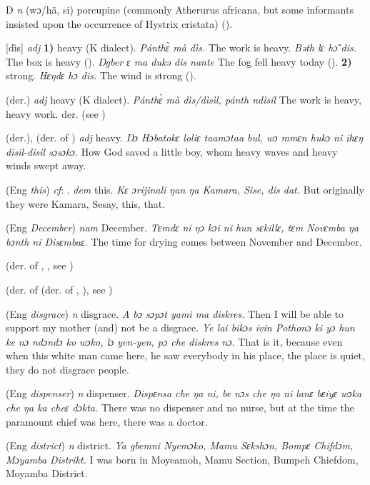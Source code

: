 \begin{letter}{D}
 \textit{n} (wɔ/hã, si) porcupine (commonly Atherurus africana, but some informants insisted upon the occurrence of Hystrix cristata) (\citealt{Pichl1967}). 

 [dìs] \textit{adj} \textbf{1)} heavy (K dialect). \textit{Pánthɛ̀ mà dìs.} The work is heavy. \textit{Bəth lɛ hɔ̃ dis.} The box is heavy (\citealt{Pichl1967}). \textit{Ŋgber ɛ ma dukə dis nante} The fog fell heavy today (\citealt{Pichl1967}). \textbf{2)} strong. \textit{Hɛŋdɛ hɔ dis.} The wind is strong (\citealt{Pichl1967}). 

 (der.) \textit{adj} heavy (K dialect). \textit{Pánthɛ̀ mà dìs/dìsìl, pánth ndìsíl} The work is heavy, heavy work. der.  (see )

 (der.), (der. of ) \textit{adj} heavy. \textit{Ŋɔ Hɔbatokɛ loliɛ taamɔtaa bul, wɔ mmɛn hukɔ ni ihɛŋ disil-disil sɔsɔkɔ.} How God saved a little boy, whom heavy waves and heavy winds swept away.

 (Eng \textit{this}) \textit{cf}: . \textit{dem} this. \textit{Kɛ ɔrijinali ŋan ŋa Kamara, Sise, dis dat.} But originally they were Kamara, Sesay, this, that.

 (Eng \textit{December}) \textit{nam} December. \textit{Tɛmdɛ ni ŋɔ kɔi ni hun sɛkillɛ, tɛm Novɛmba ŋa bɔnth ni Disɛmbaɛ.} The time for drying comes between November and December.

 (der. of , , see ) 

 (der. of  (der. of , ), see ) 

 (Eng \textit{disgrace}) \textit{n} disgrace. \textit{A bɔ sɔpɔt yami ma diskres.} Then I will be able to support my mother (and) not be a disgrace. \textit{Ye lai bikɔs ivin Pothonɔ ki yɔ hun ke nɔ ndɔndɔ ko wɔko, lɔ yen-yen, pɔ che diskres nɔ.} That is it, because even when this white man came here, he saw everybody in his place, the place is quiet, they do not disgrace people.

 (Eng \textit{dispenser}) \textit{n} dispenser. \textit{Dispɛnsa che ŋa ni, be nɔs che ŋa ni lanɛ bɛiyɛ wɔka che ŋa ka cheɛ dɔkta.} There was no dispenser and no nurse, but at the time the paramount chief was here, there was a doctor.

 (Eng \textit{district}) \textit{n} district. \textit{Ya gbemni Nyemɔko, Mamu Sɛkshɔn, Bompɛ Chifdɔm, Mɔyamba Distrikt.} I was born in Moyeamoh, Mamu Section, Bumpeh Chiefdom, Moyamba District.


\end{letter}
